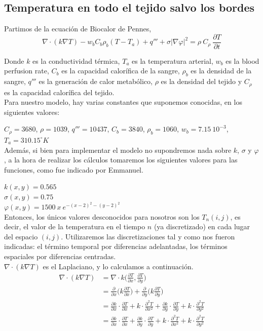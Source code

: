 \documentclass[a4paper]{article}
\begin{document}
\subsection{Temperatura en todo el tejido salvo los bordes}
Partimos de la ecuación de Biocalor de Pennes, 
$$\nabla \cdot (k \nabla T) - w_b C_b \rho_b (T-T_a) + q''' + \sigma |\nabla \varphi|^2 = \rho \ C_\rho \ \frac{\partial T}{\partial t}$$

Donde $k$ es la conductividad térmica, $T_a$ es la temperatura arterial, $w_b$ es la blood perfusion rate, $C_b$ es la capacidad calorífica de la sangre, $\rho_b$ es la densidad de la sangre, $q'''$ es la generación de calor metabólico, $\rho$ es la densidad del tejido y $C_\rho$ es la capacidad calorífica del tejido.\\

Para nuestro modelo, hay varias constantes que suponemos conocidas, en los siguientes valores:

$C_\rho= 3680$, $\rho= 1039$, $q'''= 10437$, $C_b= 3840$, $\rho_b= 1060$, $w_b=7.15 \ 10^{-3}$, $T_a = 310.15^\circ K$ \\

Además, si bien para implementar el modelo no supondremos nada sobre $k$, $\sigma$ y $\varphi$, a la hora de realizar los cálculos tomaremos los siguientes valores para las funciones,
como fue indicado por Emmanuel. 

$k(x,y)=0.565$ \\
$\sigma(x,y)=0.75$ \\
$\varphi(x,y)=1500 \ x \ e^{-(x-2)^2-(y-2)^2}$ \\

Entonces, los únicos valores desconocidos para nosotros son los $T_n(i,j)$, es decir, el valor de la temperatura en el tiempo $n$ (ya discretizado) en cada lugar del espacio $(i,j)$.
Utilizaremos las discretizaciones tal y como nos fueron indicadas: el término temporal por diferencias adelantadas, los términos espaciales por diferencias centradas. \\

$\nabla \cdot (k \nabla T)$ es el Laplaciano, y lo calculamos a continuación.
\begin{equation} \label{eq:nablaT}
\begin{split}
\nabla \cdot (k \nabla T) & = \nabla \cdot k \bigg(\frac{\partial T}{\partial x}, \frac{\partial T}{\partial y}\bigg) \\
& = \frac{\partial}{\partial x} \bigg(k \frac{\partial T}{\partial x}\bigg) + \frac{\partial}{\partial y} \bigg(k \frac{\partial T}{\partial y}\bigg) \\
& = \frac{\partial k}{\partial x} \cdot \frac{\partial T}{\partial x} + k \cdot \frac{\partial^2 T}{\partial x^2} + \frac{\partial k}{\partial y} \cdot \frac{\partial T}{\partial y} + k \cdot \frac{\partial^2 T}{\partial y^2} \\
 & = \frac{\partial k}{\partial x} \cdot \frac{\partial T}{\partial x} + \frac{\partial k}{\partial y} \cdot \frac{\partial T}{\partial y} + k \cdot \frac{\partial^2 T}{\partial x^2} + k \cdot \frac{\partial^2 T}{\partial y^2}
\end{split}
\end{equation}
\end{document}

